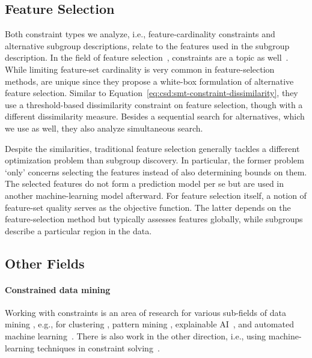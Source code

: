 \documentclass{article}
\theoremstyle{definition}
\begin{document}
\subsection{Feature Selection}
\label{sec:csd:related-work:feature-selection}

Both constraint types we analyze, i.e., feature-cardinality constraints and alternative subgroup descriptions, relate to the features used in the subgroup description.
In the field of feature selection~\cite{guyon2003introduction, li2017feature}, constraints are a topic as well~\cite{bach2023finding, bach2024alternative, bach2022empirical}.
While limiting feature-set cardinality is very common in feature-selection methods, \cite{bach2023finding, bach2024alternative} are unique since they propose a white-box formulation of alternative feature selection.
Similar to Equation~\ref{eq:csd:smt-constraint-dissimilarity}, they use a threshold-based dissimilarity constraint on feature selection, though with a different dissimilarity measure.
Besides a sequential search for alternatives, which we use as well, they also analyze simultaneous search.

Despite the similarities, traditional feature selection generally tackles a different optimization problem than subgroup discovery.
In particular, the former problem `only' concerns selecting the features instead of also determining bounds on them.
The selected features do not form a prediction model per se but are used in another machine-learning model afterward.
For feature selection itself, a notion of feature-set quality serves as the objective function.
The latter depends on the feature-selection method but typically assesses features globally, while subgroups describe a particular region in the data.

\subsection{Other Fields}
\label{sec:csd:related-work:other}

\paragraph{Constrained data mining}

Working with constraints is an area of research for various sub-fields of data mining \cite{grossi2017survey}, e.g., for clustering \cite{dao2013declarative, dao2024review}, pattern mining \cite{ng1998exploratory, silva2016constrained}, explainable AI~\cite{deutch2019constraints, gorji2022sufficient, mothilal2020explaining, shrotri2022constraint}, and automated machine learning~\cite{neutatz2023automl}.
There is also work in the other direction, i.e., using machine-learning techniques in constraint solving~\cite{popescu2022overview}.
\end{document}
